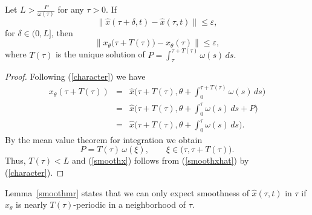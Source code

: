 \documentclass{siamltex}
\begin{document}
\begin{lemma}\label{smoothmr}
Let $L>\frac{P}{\omega(\tau)}$ for any $\tau>0$. If
\begin{equation}\label{smoothxhat}
\big\|\hat{x}(\tau+\delta,t)-\hat{x}(\tau,t)\big\|\le\varepsilon,
\end{equation}
 for $\delta\in(0,L]$, then 
\begin{equation}\label{smoothx}
\big\|x_\theta\big(\tau+T(\tau)\big)-x_\theta(\tau)\big\|\le\varepsilon,
\end{equation}
where $T(\tau)$ is the unique solution of 
$
P = \int_\tau^{\tau+T(\tau)} \omega(s)\,ds.
$
\end{lemma} 

\begin{proof}
Following (\ref{character}) we have 
\begin{eqnarray*}
x_\theta(\tau+T(\tau))&=& \hat{{{{x}}}}\bigg(\tau+T(\tau), \theta+\int_0^{\tau+T(\tau)}\omega(s)\,ds\bigg)\\
&=& \hat{x}\bigg(\tau+T(\tau), \theta+\int_0^\tau\omega(s)\,ds+P\bigg)\\
&=& \hat{x}\bigg(\tau+T(\tau), \theta+\int_0^\tau\omega(s)\,ds\bigg).
\end{eqnarray*}
{{{B}}}y the mean value theorem for integration we obtain
$$
P = T(\tau)\, \omega(\xi),\qquad \xi\in\big(\tau,\tau+T(\tau)\big).
$$
Thus, $T(\tau)<L$ and (\ref{smoothx}) follows from (\ref{smoothxhat}) by (\ref{character}).
\end{proof}

Lemma~\ref{smoothmr} states that we can only expect smoothness of $\hat{x}(\tau,t)$
in $\tau$ if $x_\theta$ is nearly $T(\tau)$-periodic in a neighborhood
of $\tau$. 
\end{document}
